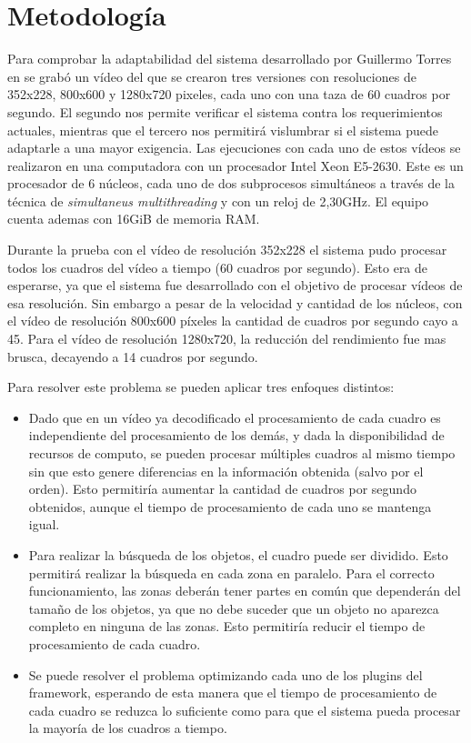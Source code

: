 
\section{Metodología}

Para comprobar la adaptabilidad del sistema desarrollado por Guillermo Torres en
\cite{torres2014} se grabó un vídeo del que se crearon tres versiones con
resoluciones de 352x228, 800x600 y 1280x720 pixeles, cada uno con una taza de 60
cuadros por segundo. El segundo nos permite verificar el sistema contra los
requerimientos actuales, mientras que el tercero nos permitirá vislumbrar si el
sistema puede adaptarle a una mayor exigencia. Las ejecuciones con cada uno de
estos vídeos se realizaron en una computadora con un procesador Intel Xeon
E5-2630. Este es un procesador de 6 núcleos, cada uno de dos subprocesos
simultáneos a través de la técnica de \emph{simultaneus multithreading} y con un
reloj de 2,30GHz. El equipo cuenta ademas con 16GiB de memoria RAM.

Durante la prueba con el vídeo de resolución 352x228 el sistema pudo procesar
todos los cuadros del vídeo a tiempo (60 cuadros por segundo). Esto era de
esperarse, ya que el sistema fue desarrollado con el objetivo de procesar vídeos
de esa resolución. Sin embargo a pesar de la velocidad y cantidad de los
núcleos, con el vídeo de resolución 800x600 píxeles la cantidad de cuadros por
segundo cayo a 45. Para el vídeo de resolución 1280x720, la reducción del
rendimiento fue mas brusca, decayendo a 14 cuadros por segundo.

Para resolver este problema se pueden aplicar tres enfoques distintos:

\begin{itemize}

\item 	Dado que en un vídeo ya decodificado el procesamiento de cada cuadro es
	independiente del procesamiento de los demás, y dada la disponibilidad
	de recursos de computo, se pueden procesar múltiples cuadros al mismo
	tiempo sin que esto genere diferencias en la información obtenida (salvo
	por el orden). Esto permitiría aumentar la cantidad de cuadros por
	segundo obtenidos, aunque el tiempo de procesamiento de cada uno se
	mantenga igual.

\item	Para realizar la búsqueda de los objetos, el cuadro puede ser dividido.
	Esto permitirá realizar la búsqueda en cada zona en paralelo. Para el
	correcto funcionamiento, las zonas deberán tener partes en común que
	dependerán del tamaño de los objetos, ya que no debe suceder que un
	objeto no aparezca completo en ninguna de las zonas. Esto permitiría
	reducir el tiempo de procesamiento de cada cuadro.

\item	Se puede resolver el problema optimizando cada uno de los plugins del
	framework, esperando de esta manera que el tiempo de procesamiento de
	cada cuadro se reduzca lo suficiente como para que el sistema pueda
	procesar la mayoría de los cuadros a tiempo.

\end{itemize}

